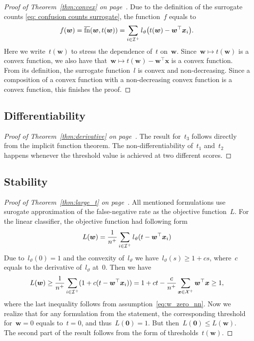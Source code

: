 \thmconvex*
\begin{proof}[Proof of Theorem~\ref{thm:convex} on page~\pageref{thm:convex}]
  Due to the definition of the surrogate counts \eqref{eq: confusion counts surrogate}, the function~$f$ equals to
  \begin{equation*}
    f(\bm{w}) = \fns(\bm{w}, t(\bm{w})) = \sum_{i \in \I^+} l_{\vartheta} \Brac{t(\bm{w}) - \bm{w}^\top \bm{x}_i}.
  \end{equation*}
  Here we write~$t(\bm{w})$ to stress the dependence of~$t$ on~$\bm{w}$. Since~$\bm{w}\mapsto t(\bm{w})$ is a convex function, we also have that~$\bm{w}\mapsto t(\bm{w})-\bm{w}^\top \bm{x}$ is a convex function. From its definition, the surrogate function~$l$ is convex and non-decreasing. Since a composition of a convex function with a non-decreasing convex function is a convex function, this finishes the proof.
\end{proof}

\subsection{Differentiability}

\derivative* 
\begin{proof}[Proof of Theorem~\ref{thm:derivative} on page~\pageref{thm:derivative}]
  The result for~$t_3$ follows directly from the implicit function theorem. The non-differentiability of~$t_1$ and~$t_2$ happens whenever the threshold value is achieved at two different scores.
\end{proof}

\subsection{Stability}

\larget*
\begin{proof}[Proof of Theorem~\ref{thm:large_t} on page~\pageref{thm:large_t}]
  All mentioned formulations use surogate approximation of the false-negative rate as the objective function~$L.$ For the linear classifier, the objective function had following form
  \begin{equation*}
    L(\bm{w})
      = \frac{1}{n^+}\sum_{i \in \mathcal{I}^+}l_{\vartheta}(t - \bm{w}^\top \bm{x}_i)
  \end{equation*}
  Due to~$l_{\vartheta}(0) = 1$ and the convexity of~$l_{\vartheta}$ we have~$l_{\vartheta}(s) \ge 1 + cs$, where~$c$ equals to the derivative of~$l_{\vartheta}$ at~$0$. Then we have
  \begin{equation*}
    L(\bm{w}) 
      \ge \frac{1}{n^+} \sum_{i \in \mathcal{I}^+}(1 + c(t-\bm{w}^\top \bm{x}_i))
      = 1 + ct - \frac{c}{n^+}\sum_{\bm{x} \in \mathcal{X}^+}\bm{w}^\top \bm{x}
      \ge 1,
  \end{equation*}
  where the last inequality follows from assumption~\eqref{eq:w_zero_nn}. Now we realize that for any formulation from the statement, the corresponding threshold for~$\bm{w}=0$ equals to~$t=0$, and thus~$L(\bm{0})=1$. But then~$L(\bm{0}) \le L(\bm{w})$. The second part of the result follows from the form of thresholds~$t(\bm{w})$.
\end{proof}

